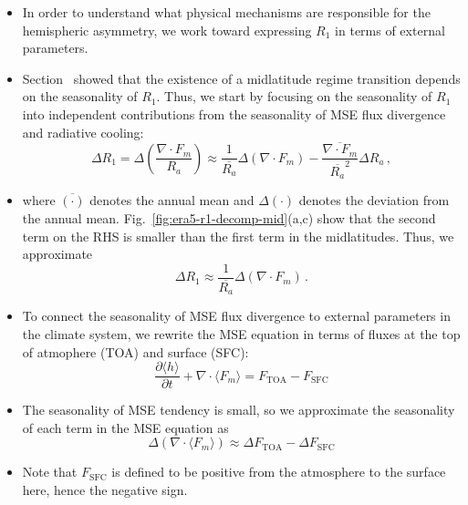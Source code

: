 \documentclass{ametsocV5}
\begin{document}
\appendix[B]
\begin{itemize}
  \item In order to understand what physical mechanisms are responsible for the hemispheric asymmetry, we work toward expressing $R_{1}$ in terms of external parameters.
  \item Section~\label{subsec:asym} showed that the existence of a midlatitude regime transition depends on the seasonality of $R_{1}$. Thus, we start by focusing on the seasonality of $R_{1}$ into independent contributions from the seasonality of MSE flux divergence and radiative cooling:
        \begin{equation} \label{eq:r1-linear}
          \Delta R_{1} = \Delta\left(\frac{\nabla\cdot F_{m}}{R_{a}}\right) \approx \frac{1}{\overline{R_{a}}}\Delta(\nabla\cdot F_{m}) - \frac{\overline{\nabla\cdot F_{m}}}{\overline{R_{a}}^{2}}\Delta R_{a} \, ,
        \end{equation}
  \item where $\overline{(\cdot)}$ denotes the annual mean and $\Delta(\cdot)$ denotes the deviation from the annual mean. Fig.~\ref{fig:era5-r1-decomp-mid}(a,c) show that the second term on the RHS is smaller than the first term in the midlatitudes. Thus, we approximate
        \begin{equation} \label{eq:r1-term1}
          \Delta R_{1} \approx \frac{1}{\overline{R_{a}}}\Delta(\nabla\cdot F_{m}) \, .
        \end{equation}
  \item To connect the seasonality of MSE flux divergence to external parameters in the climate system, we rewrite the MSE equation in terms of fluxes at the top of atmophere (TOA) and surface (SFC):
        \begin{equation}\label{eq:mse-toasfc}
          \frac{\partial \langle h \rangle}{\partial t} + \nabla\cdot \langle F_{m} \rangle = F_{\mathrm{TOA}} - F_{\mathrm{SFC}}
        \end{equation}
  \item The seasonality of MSE tendency is small, so we approximate the seasonality of each term in the MSE equation as
        \begin{equation}\label{eq:mse-toasfc-approx}
          \Delta (\nabla\cdot \langle F_{m} \rangle) \approx \Delta F_{\mathrm{TOA}} - \Delta F_{\mathrm{SFC}}
        \end{equation}
  \item Note that \(F_{\mathrm{SFC}}\) is defined to be positive from the atmosphere to the surface here, hence the negative sign.

\end{itemize}
\end{document}
